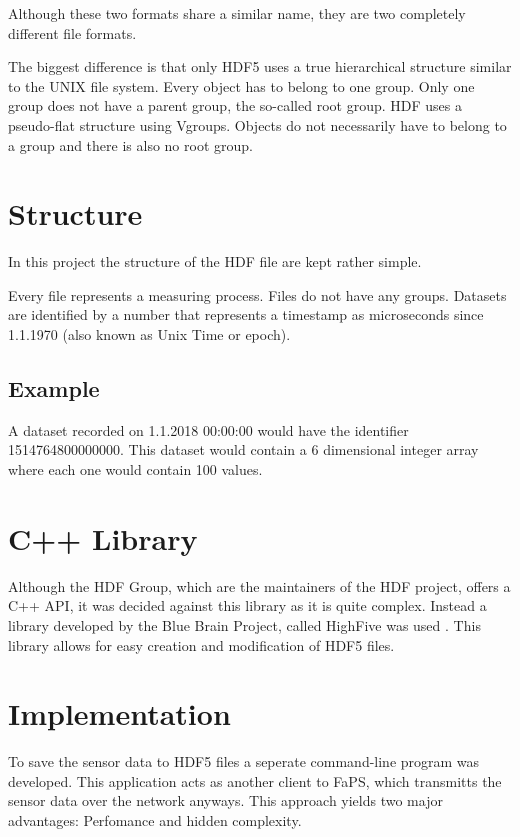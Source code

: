 Although these two formats share a similar name, they are two completely different file formats.

The biggest difference is that only HDF5 uses a true hierarchical structure similar to the UNIX file system. Every object has to belong to one group. Only one group does not have a parent group, the so-called root group.
HDF uses a pseudo-flat structure using Vgroups. Objects do not necessarily have to belong to a group and there is also no root group.

\section{Structure}

In this project the structure of the HDF file are kept rather simple.

Every file represents a measuring process. Files do not have any groups. Datasets are identified by a number that represents a timestamp as microseconds since 1.1.1970 (also known as Unix Time or epoch).

\subsection{Example}

A dataset recorded on 1.1.2018 00:00:00 would have the identifier 1514764800000000. This dataset would contain a 6 dimensional integer array where each one would contain 100 values.

\section {C++ Library}

Although the HDF Group, which are the maintainers of the HDF project, offers a C++ API, it was decided against this library as it is quite complex. Instead a library developed by the Blue Brain Project, called HighFive was
used \autocite{HighFive}. This library allows for easy creation and modification of HDF5 files.

\section{Implementation}

To save the sensor data to HDF5 files a seperate command-line program was developed. This application acts as another client to FaPS, which transmitts the sensor data over the network anyways. This approach yields two
major advantages: Perfomance and hidden complexity.

